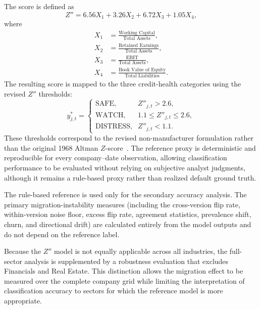 \documentclass[11pt]{article}
\begin{document}
The score is defined as
\begin{equation}
Z'' = 6.56X_1 + 3.26X_2 + 6.72X_3 + 1.05X_4,
\end{equation}
where
\begin{align}
X_1&=\frac{\text{Working Capital}}{\text{Total Assets}}, \nonumber\\
X_2&=\frac{\text{Retained Earnings}}{\text{Total Assets}}, \nonumber\\
X_3&=\frac{\text{EBIT}}{\text{Total Assets}}, \nonumber\\
X_4&=\frac{\text{Book Value of Equity}}{\text{Total Liabilities}}.
\end{align}
The resulting score is mapped to the three credit-health categories using the revised $Z''$ thresholds:
\begin{equation}
y^{*}_{j,t}=
\begin{cases}
\text{SAFE}, & Z''_{j,t}>2.6,\\[2pt]
\text{WATCH}, & 1.1\leq Z''_{j,t}\leq 2.6,\\[2pt]
\text{DISTRESS}, & Z''_{j,t}<1.1.
\end{cases}
\end{equation}
These thresholds correspond to the revised non-manufacturer formulation rather than the original 1968 Altman $Z$-score~\cite{altman}. The reference proxy is deterministic and reproducible for every company--date observation, allowing classification performance to be evaluated without relying on subjective analyst judgments, although it remains a rule-based proxy rather than realized default ground truth.

The rule-based reference is used only for the secondary accuracy analysis. The primary migration-instability measures (including the cross-version flip rate, within-version noise floor, excess flip rate, agreement statistics, prevalence shift, churn, and directional drift) are calculated entirely from the model outputs and do not depend on the reference label.

Because the $Z''$ model is not equally applicable across all industries, the full-sector analysis is supplemented by a robustness evaluation that excludes Financials and Real Estate. This distinction allows the migration effect to be measured over the complete company grid while limiting the interpretation of classification accuracy to sectors for which the reference model is more appropriate.
\end{document}
